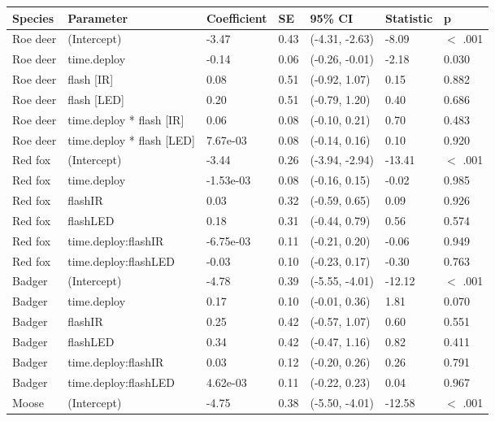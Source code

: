 \begin{table}[ht]
\centering
\begin{tabular}{lllllll}
  \hline
Species & Parameter & Coefficient & SE & 95\% CI & Statistic & p \\ 
  \hline
Roe deer & (Intercept) & -3.47 & 0.43 & (-4.31, -2.63) & -8.09 & $<$ .001 \\ 
  Roe deer & time.deploy & -0.14 & 0.06 & (-0.26, -0.01) & -2.18 & 0.030  \\ 
  Roe deer & flash [IR] & 0.08 & 0.51 & (-0.92,  1.07) & 0.15 & 0.882  \\ 
  Roe deer & flash [LED] & 0.20 & 0.51 & (-0.79,  1.20) & 0.40 & 0.686  \\ 
  Roe deer & time.deploy * flash [IR] & 0.06 & 0.08 & (-0.10,  0.21) & 0.70 & 0.483  \\ 
  Roe deer & time.deploy * flash [LED] & 7.67e-03 & 0.08 & (-0.14,  0.16) & 0.10 & 0.920  \\ 
  Red fox & (Intercept) & -3.44 & 0.26 & (-3.94, -2.94) & -13.41 & $<$ .001 \\ 
  Red fox & time.deploy & -1.53e-03 & 0.08 & (-0.16,  0.15) & -0.02 & 0.985  \\ 
  Red fox & flashIR & 0.03 & 0.32 & (-0.59,  0.65) & 0.09 & 0.926  \\ 
  Red fox & flashLED & 0.18 & 0.31 & (-0.44,  0.79) & 0.56 & 0.574  \\ 
  Red fox & time.deploy:flashIR & -6.75e-03 & 0.11 & (-0.21,  0.20) & -0.06 & 0.949  \\ 
  Red fox & time.deploy:flashLED & -0.03 & 0.10 & (-0.23,  0.17) & -0.30 & 0.763  \\ 
  Badger & (Intercept) & -4.78 & 0.39 & (-5.55, -4.01) & -12.12 & $<$ .001 \\ 
  Badger & time.deploy & 0.17 & 0.10 & (-0.01,  0.36) & 1.81 & 0.070  \\ 
  Badger & flashIR & 0.25 & 0.42 & (-0.57,  1.07) & 0.60 & 0.551  \\ 
  Badger & flashLED & 0.34 & 0.42 & (-0.47,  1.16) & 0.82 & 0.411  \\ 
  Badger & time.deploy:flashIR & 0.03 & 0.12 & (-0.20,  0.26) & 0.26 & 0.791  \\ 
  Badger & time.deploy:flashLED & 4.62e-03 & 0.11 & (-0.22,  0.23) & 0.04 & 0.967  \\ 
  Moose & (Intercept) & -4.75 & 0.38 & (-5.50, -4.01) & -12.58 & $<$ .001 \\ 

\end{tabular}
\end{table}
